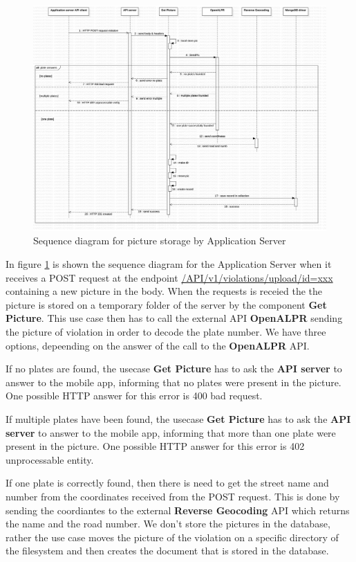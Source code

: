 \begin{figure}[H]
\centering
\includegraphics[width=\textwidth]{Images/DDSeqSeverPic.png}
\caption{\label{fig:DDSeqSeverPic} Sequence diagram for picture storage by Application Server}
\end{figure}
In figure \ref{fig:DDSeqSeverPic} is shown the sequence diagram for the Application Server when it receives a POST request at the endpoint \url{/API/v1/violations/upload/id=xxx} containing a new picture in the body. When the requests is receied the the picture is stored on a temporary folder of the server by the component \textbf{Get Picture}. This use case then has to call the external API \textbf{OpenALPR} sending the picture of violation in order to decode the plate number. We have three options, depeending on the answer of the call to the \textbf{OpenALPR} API.

If no plates are found, the usecase \textbf{Get Picture} has to ask the \textbf{API server} to answer to the mobile app, informing that no plates were present in the picture. One possible HTTP answer for this error is \textcolor{poliblue}{400 bad request}.

If multiple plates have been found, the usecase \textbf{Get Picture} has to ask the \textbf{API server} to answer to the mobile app, informing that more than one plate were present in the picture. One possible HTTP answer for this error is \textcolor{poliblue}{402 unprocessable entity}.

If one plate is correctly found, then there is need to get the street name and number from the coordinates received from the POST request. This is done by sending the coordiantes to the external \textbf{Reverse Geocoding} API which returns the name and the road number.
We don't store the pictures in the database, rather the use case moves the picture of the violation on a specific directory of the filesystem and then creates the document that is stored in the database. 


